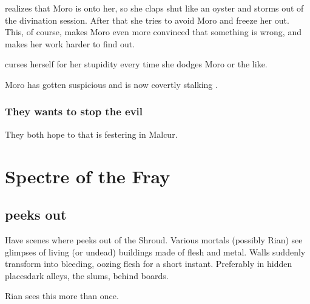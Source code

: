 \begin{garbage}
\Tiroco{} realizes that Moro is onto her, so she claps shut like an oyster and storms out of the divination session. After that she tries to avoid Moro and freeze her out. This, of course, makes Moro even more convinced that something is wrong, and makes her work harder to find out. 

\Tiroco{} curses herself for her stupidity every time she dodges Moro or the like.



Moro has gotten suspicious and is now covertly stalking \Tiroco.





\subsubsection{They wants to stop the evil}
They both hope to  that is festering in Malcur. 












\section{Spectre of the Fray}













\subsection{\Nithdornazsh{} peeks out}
Have scenes where \Nithdornazsh{} peeks out of the Shroud. 
Various mortals (possibly Rian) see glimpses of living (or undead) buildings made of flesh and metal. 
Walls suddenly transform into bleeding, oozing flesh for a short instant. 
Preferably in hidden places\dash dark alleys, the slums, behind boards.

Rian sees this more than once. 










\end{garbage}
